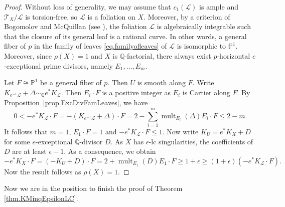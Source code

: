 \documentclass[12pt,twoside]{amsart}
\DeclareMathOperator{\mult}{mult}
\theoremstyle{definition}
\begin{document}
\begin{proof}
	Without loss of generality, we may assume that $c_1(\mathcal{L})$ is ample and $\mathcal{T}_X/\mathcal{L}$ is torsion-free, so $\mathcal{L}$ is a foliation on $X$. Moreover, by a criterion of Bogomolov and McQuillan (see \cite[Theorem~1]{KebekusSolaCondeToma2007}), the foliation $\mathcal{L}$ is algebraically integrable such that the closure of its general leaf is a rational curve. In other words, a general fiber of $p$ in the family of leaves \eqref{eq.familyofleaves} of $\mathcal{L}$ is isomorphic to $\mathbb{P}^1$. Moreover, since $\rho(X)=1$ and $X$ is $\mathbb{Q}$-factorial, there always exist $p$-horizontal $e$-exceptional prime divisors, namely $E_1,\dots,E_{m}$.
	
	Let $F\cong \mathbb{P}^1$ be a general fiber of $p$. Then $U$ is smooth along $F$. Write $K_{e^{-1}\mathcal{L}}+\Delta \sim_{\mathbb{Q}} e^*K_{\mathcal{L}}$. Then $E_i\cdot F$ is a positive integer as $E_i$ is Cartier along $F$. By Proposition~\ref{prop.ExcDivFamLeaves}, we have
	\[
	0 < -e^*K_{\mathcal{L}}\cdot F = -(K_{e^{-1}\mathcal{L}}+\Delta)\cdot F= 2 - \sum_{i=1}^m \mult_{E_i}(\Delta) E_i\cdot F \leq 2-m.
	\]
	It follows that $m=1$, $E_1\cdot F=1$ and $-e^*K_{\mathcal{L}}\cdot F\leq 1$. Now write $K_{U}=e^*K_X+D$ for some $e$-exceptional $\mathbb{Q}$-divisor $D$. As $X$ has $\epsilon$-lc singularities, the coefficients of $D$ are at least $\epsilon-1$. As a consequence, we obtain
	\[
	-e^*K_X\cdot F = (-K_U + D)\cdot F = 2 +\mult_{E_1}(D) E_1\cdot F \geq 1 + \epsilon \geq (1+\epsilon)(-e^*K_{\mathcal{L}}\cdot F). 
	\]
	Now the result follows as $\rho(X)=1$.
\end{proof}

Now we are in the position to finish the proof of Theorem \ref{thm.KMinqEpsilonLC}.
	
\end{document}
